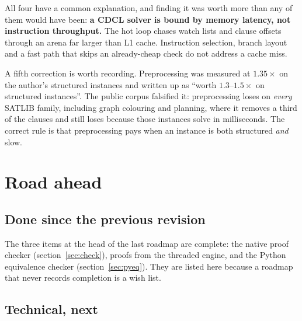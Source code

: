 \documentclass[11pt,a4paper]{article}
\begin{document}
All four have a common explanation, and finding it was worth more than any of
them would have been: \textbf{a CDCL solver is bound by memory latency, not
instruction throughput.} The hot loop chases watch lists and clause offsets
through an arena far larger than L1 cache. Instruction selection, branch layout
and a fast path that skips an already-cheap check do not address a cache miss.

A fifth correction is worth recording. Preprocessing was measured at
$1.35\times$ on the author's structured instances and written up as ``worth
$1.3$--$1.5\times$ on structured instances''. The public corpus falsified it:
preprocessing loses on \emph{every} SATLIB family, including graph colouring
and planning, where it removes a third of the clauses and still loses because
those instances solve in milliseconds. The correct rule is that preprocessing
pays when an instance is both structured \emph{and} slow.

\section{Road ahead}
\label{sec:road}

\subsection*{Done since the previous revision}

The three items at the head of the last roadmap are complete: the native proof
checker (section~\ref{sec:check}), proofs from the threaded engine, and the
Python equivalence checker (section~\ref{sec:pyeq}). They are listed here because a roadmap that
never records completion is a wish list.

\subsection*{Technical, next}
\end{document}
